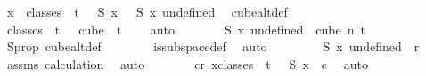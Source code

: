 \begin{isabellebody}
\ {\isachardoublequoteopen}{\isasymforall}x\ {\isasymin}\ classes\ {}\ t\ {}{\isachardot}{\kern0pt}\ {\isasymchi}\ {\isacharparenleft}{\kern0pt}S\ x{\isacharparenright}{\kern0pt}\ {\isacharequal}{\kern0pt}\ {\isasymchi}\ {\isacharparenleft}{\kern0pt}S\ {\isacharparenleft}{\kern0pt}{\isasymlambda}x{\isachardot}{\kern0pt}\ undefined{\isacharparenright}{\kern0pt}{\isacharparenright}{\kern0pt}{\isachardoublequoteclose}\ \isamarkupfalse%
\ cube{}{\isacharunderscore}{\kern0pt}alt{\isacharunderscore}{\kern0pt}def\ \isanewline
\ \ \ \ \ \ \isamarkupfalse%
\ {\isacartoucheopen}classes\ {}\ t\ {}\ {\isacharequal}{\kern0pt}\ cube\ {}\ {\isacharparenleft}{\kern0pt}t\ {\isacharplus}{\kern0pt}\ {}{\isacharparenright}{\kern0pt}{\isacartoucheclose}\ \isamarkupfalse%
\ auto\isanewline
\ \ \ \ \isamarkupfalse%
\ \isamarkupfalse%
\ {\isachardoublequoteopen}S\ {\isacharparenleft}{\kern0pt}{\isasymlambda}x{\isachardot}{\kern0pt}\ undefined{\isacharparenright}{\kern0pt}\ {\isasymin}\ cube\ n\ {\isacharparenleft}{\kern0pt}t{\isacharplus}{\kern0pt}{}{\isacharparenright}{\kern0pt}{\isachardoublequoteclose}\ \isamarkupfalse%
\ S{\isacharunderscore}{\kern0pt}prop\ cube{}{\isacharunderscore}{\kern0pt}alt{\isacharunderscore}{\kern0pt}def\isanewline
\ \ \ \ \ \ \isamarkupfalse%
\ is{\isacharunderscore}{\kern0pt}subspace{\isacharunderscore}{\kern0pt}def\ \isamarkupfalse%
\ auto\isanewline
\ \ \ \ \isamarkupfalse%
\ \isamarkupfalse%
\ {\isachardoublequoteopen}{\isasymchi}\ {\isacharparenleft}{\kern0pt}S\ {\isacharparenleft}{\kern0pt}{\isasymlambda}x{\isachardot}{\kern0pt}\ undefined{\isacharparenright}{\kern0pt}{\isacharparenright}{\kern0pt}\ {\isacharless}{\kern0pt}\ r{\isachardoublequoteclose}\ \isamarkupfalse%
\ assms\ calculation\ \isamarkupfalse%
\ auto\isanewline
\ \ \ \ \isamarkupfalse%
\ \isamarkupfalse%
\ {\isachardoublequoteopen}{\isasymexists}c{\isacharless}{\kern0pt}r{\isachardot}{\kern0pt}\ {\isasymforall}x{\isasymin}classes\ {}\ t\ {}{\isachardot}{\kern0pt}\ {\isasymchi}\ {\isacharparenleft}{\kern0pt}S\ x{\isacharparenright}{\kern0pt}\ {\isacharequal}{\kern0pt}\ c{\isachardoublequoteclose}\ \isamarkupfalse%
\ auto\isanewline
\ \ \isamarkupfalse%
\isanewline
\ \ \isamarkupfalse%

\end{isabellebody}
